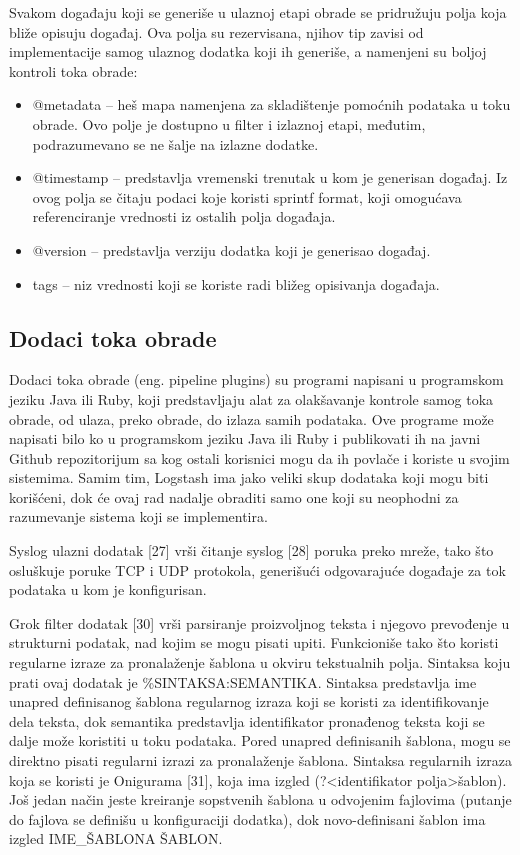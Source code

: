\par
Svakom događaju koji se generiše u ulaznoj etapi obrade se pridružuju polja koja bliže opisuju događaj. Ova polja su rezervisana, njihov tip zavisi od implementacije samog ulaznog dodatka koji ih generiše, a namenjeni su boljoj kontroli toka obrade:
\begin{itemize}
    \item @metadata – heš mapa namenjena za skladištenje pomoćnih podataka u toku obrade. Ovo polje je dostupno u filter i izlaznoj etapi, međutim, podrazumevano se ne šalje na izlazne dodatke.
    \item @timestamp – predstavlja vremenski trenutak u kom je generisan događaj. Iz ovog polja se čitaju podaci koje koristi sprintf format, koji omogućava referenciranje vrednosti iz ostalih polja događaja.
    \item @version – predstavlja verziju dodatka koji je generisao događaj.
    \item tags – niz vrednosti koji se koriste radi bližeg opisivanja događaja.
\end{itemize}

\subsection{Dodaci toka obrade}
Dodaci toka obrade (eng. pipeline plugins) su programi napisani u programskom jeziku Java ili Ruby, koji predstavljaju alat za olakšavanje kontrole samog toka obrade, od ulaza, preko obrade, do izlaza samih podataka. Ove programe može napisati bilo ko u programskom jeziku Java ili Ruby i publikovati ih na javni Github repozitorijum sa kog ostali korisnici mogu da ih povlače i koriste u svojim sistemima. Samim tim, Logstash ima jako veliki skup dodataka koji mogu biti korišćeni, dok će ovaj rad nadalje obraditi samo one koji su neophodni za razumevanje sistema koji se implementira.

\par
Syslog ulazni dodatak [27] vrši čitanje syslog [28] poruka preko mreže, tako što osluškuje poruke TCP i UDP protokola, generišući odgovarajuće događaje za tok podataka u kom je konfigurisan. 

\par
Grok filter dodatak [30] vrši parsiranje proizvoljnog teksta i njegovo prevođenje u strukturni podatak, nad kojim se mogu pisati upiti. Funkcioniše tako što koristi regularne izraze za pronalaženje šablona u okviru tekstualnih polja. Sintaksa koju prati ovaj dodatak je \%{SINTAKSA:SEMANTIKA}. Sintaksa predstavlja ime unapred definisanog šablona regularnog izraza koji se koristi za identifikovanje dela teksta, dok semantika predstavlja identifikator pronađenog teksta koji se dalje može koristiti u toku podataka. Pored unapred definisanih šablona, mogu se direktno pisati regularni izrazi za pronalaženje šablona. Sintaksa regularnih izraza koja se koristi je Onigurama [31], koja ima izgled (?<identifikator polja>šablon). Još jedan način jeste kreiranje sopstvenih šablona u odvojenim fajlovima (putanje do fajlova se definišu u konfiguraciji dodatka), dok novo-definisani šablon ima izgled IME\_ŠABLONA ŠABLON.

